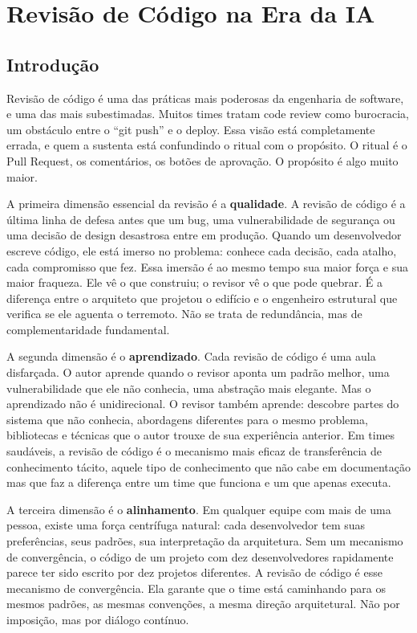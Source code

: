 \chapter{Revisão de Código na Era da IA}

\section{Introdução}

Revisão de código é uma das práticas mais poderosas da engenharia de software,
e uma das mais subestimadas. Muitos times tratam code review como burocracia,
um obstáculo entre o ``git push'' e o deploy. Essa visão está completamente errada,
e quem a sustenta está confundindo o ritual com o propósito. O ritual é o Pull Request,
os comentários, os botões de aprovação. O propósito é algo muito maior.

A primeira dimensão essencial da revisão é a \textbf{qualidade}. A revisão de código
é a última linha de defesa antes que um bug, uma vulnerabilidade de segurança ou uma
decisão de design desastrosa entre em produção. Quando um desenvolvedor escreve código,
ele está imerso no problema: conhece cada decisão, cada atalho, cada compromisso que
fez. Essa imersão é ao mesmo tempo sua maior força e sua maior fraqueza. Ele vê o que
construiu; o revisor vê o que pode quebrar. É a diferença entre o arquiteto que
projetou o edifício e o engenheiro estrutural que verifica se ele aguenta o terremoto.
Não se trata de redundância, mas de complementaridade fundamental.

A segunda dimensão é o \textbf{aprendizado}. Cada revisão de código é uma aula
disfarçada. O autor aprende quando o revisor aponta um padrão melhor, uma
vulnerabilidade que ele não conhecia, uma abstração mais elegante. Mas o aprendizado
não é unidirecional. O revisor também aprende: descobre partes do sistema que
não conhecia, abordagens diferentes para o mesmo problema, bibliotecas e
técnicas que o autor trouxe de sua experiência anterior. Em times saudáveis, a revisão
de código é o mecanismo mais eficaz de transferência de conhecimento tácito, aquele
tipo de conhecimento que não cabe em documentação mas que faz a diferença entre um
time que funciona e um que apenas executa.

A terceira dimensão é o \textbf{alinhamento}. Em qualquer equipe com mais de uma
pessoa, existe uma força centrífuga natural: cada desenvolvedor tem suas preferências,
seus padrões, sua interpretação da arquitetura. Sem um mecanismo de convergência, o
código de um projeto com dez desenvolvedores rapidamente parece ter sido escrito por
dez projetos diferentes. A revisão de código é esse mecanismo de convergência. Ela
garante que o time está caminhando para os mesmos padrões, as mesmas convenções, a
mesma direção arquitetural. Não por imposição, mas por diálogo contínuo.


